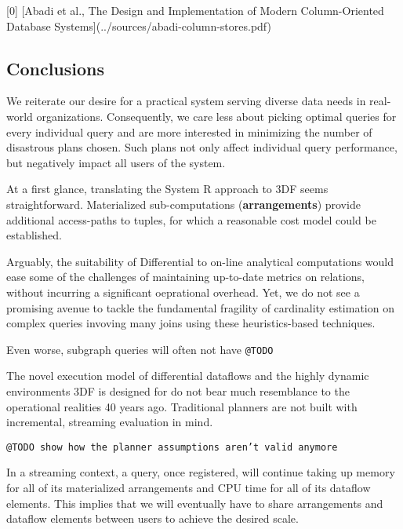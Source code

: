 \documentclass[../index.tex]{subfiles}
\begin{document}
[0] [Abadi et al., The Design and Implementation of Modern Column-Oriented Database Systems](../sources/abadi-column-stores.pdf)

\subsection{Conclusions}

We reiterate our desire for a practical system serving diverse data
needs in real-world organizations. Consequently, we care less about
picking optimal queries for every individual query and are more
interested in minimizing the number of disastrous plans chosen. Such
plans not only affect individual query performance, but negatively
impact all users of the system.

At a first glance, translating the System R approach to 3DF seems
straightforward. Materialized sub-computations (\textbf{arrangements})
provide additional access-paths to tuples, for which a reasonable cost
model could be established. 

Arguably, the suitability of Differential to on-line analytical
computations would ease some of the challenges of maintaining
up-to-date metrics on relations, without incurring a significant
oeprational overhead. Yet, we do not see a promising avenue to tackle
the fundamental fragility of cardinality estimation on complex queries
invoving many joins using these heuristics-based techniques.

Even worse, subgraph queries will often not have \texttt{@TODO}

The novel execution model of differential dataflows and the highly
dynamic environments 3DF is designed for do not bear much resemblance
to the operational realities 40 years ago. Traditional planners are
not built with incremental, streaming evaluation in mind.

\texttt{@TODO show how the planner assumptions aren't valid anymore}

In a streaming context, a query, once registered, will continue taking
up memory for all of its materialized arrangements and CPU time for
all of its dataflow elements. This implies that we will eventually
have to share arrangements and dataflow elements between users to
achieve the desired scale.
\end{document}
